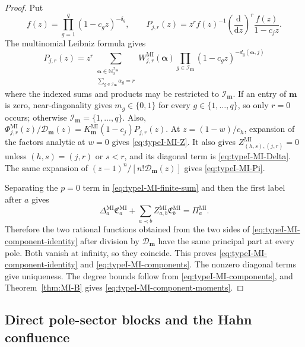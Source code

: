 \documentclass[10pt]{amsart}
\newcommand{\mm}{\boldsymbol m}
\theoremstyle{plain}
\theoremstyle{definition}
\theoremstyle{remark}
\begin{document}
\begin{proof}
Put
\[
 f(z)=\prod_{g=1}^q(1-c_gz)^{-\delta_g},\qquad
 P_{j,r}(z)=z^rf(z)^{-1}
 \left(\frac{\mathrm d}{\mathrm dz}\right)^r
 \frac{f(z)}{1-c_jz}.
\]
The multinomial Leibniz formula gives
\[
 P_{j,r}(z)
 =z^r\sum_{\substack{\boldsymbol\alpha\in
                      \mathbb N_0^{\mathcal I_{\boldsymbol m}}\\
                      \sum_{g\in\mathcal I_{\boldsymbol m}}\alpha_g=r}}
 W_{j,r}^{\mathrm{MI}}(\boldsymbol\alpha)
 \prod_{g\in\mathcal I_{\boldsymbol m}}
 (1-c_gz)^{-d_g(\boldsymbol\alpha,j)}
\]
where the indexed sums and products may be restricted to
\(\mathcal I_{\boldsymbol m}\). If an entry of
\(\boldsymbol m\) is zero, near-diagonality gives
\(m_g\in\{0,1\}\) for every \(g\in\{1,\ldots,q\}\), so only \(r=0\)
occurs; otherwise
\(\mathcal I_{\boldsymbol m}=\{1,\ldots,q\}\). Also,
\(\Phi_{j,r}^{\mathrm{MI}}(z)/\mathcal D_{\boldsymbol m}(z)
=K_{\mm}^{\mathrm{MI}}(1-c_j)P_{j,r}(z)\).
At \(z=(1-w)/c_h\), expansion of the factors analytic at \(w=0\)
gives \eqref{eq:typeI-MI-Z}. It also gives
\(Z_{(h,s),(j,r)}^{\mathrm{MI}}=0\) unless
\((h,s)=(j,r)\) or \(s<r\),
and its diagonal term is \eqref{eq:typeI-MI-Delta}.  The same expansion
of \((z-1)^n/[n!\mathcal D_{\boldsymbol m}(z)]\) gives
\eqref{eq:typeI-MI-Pi}.

Separating the \(p=0\) term in \eqref{eq:typeI-MI-finite-sum} and then
the first label after \(a\) gives
\[
 \Delta_a^{\mathrm{MI}}\mathfrak C_a^{\mathrm{MI}}
 +\sum_{a\prec b}Z_{a,b}^{\mathrm{MI}}
 \mathfrak C_b^{\mathrm{MI}}
 =\Pi_a^{\mathrm{MI}}.
\]
Therefore the two rational functions obtained from the two sides of
\eqref{eq:typeI-MI-component-identity} after division by
\(\mathcal D_{\boldsymbol m}\) have the same principal part at every
pole.  Both vanish at infinity, so they coincide.  This proves
\eqref{eq:typeI-MI-component-identity} and
\eqref{eq:typeI-MI-components}.  The nonzero diagonal terms give
uniqueness. The degree bounds follow from
\eqref{eq:typeI-MI-components}, and Theorem~\ref{thm:MI-B} gives
\eqref{eq:typeI-MI-component-moments}.
\end{proof}

\subsection{Direct pole-sector blocks and the Hahn confluence}
\label{subsec:MI-direct-sector-blocks}
\end{document}
